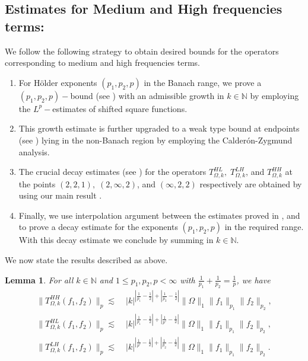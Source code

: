 \documentclass[a4paper,reqno]{amsart}
\newcommand{\N}{{\mathbb N}}
\newtheorem{lemma}[theorem]{Lemma}
\theoremstyle{definition}
\numberwithin{equation}{section}
\begin{document}
\subsection*{Estimates for Medium and High frequencies terms:} We follow the following strategy to obtain desired bounds for the operators corresponding to medium and high frequencies terms. 
\begin{enumerate}
	\item For H\"older exponents $(p_1,p_2,p)$ in the Banach range, we prove a $(p_1,p_2,p)-$bound (see ) with an admissible growth in $k\in\N$ by employing the $L^p-$estimates of shifted square functions. 
	\item This growth estimate is further upgraded to a weak type bound at endpoints (see ) lying in the non-Banach region by employing the Calder\'on-Zygmund analysis. 
	\item The crucial decay estimates (see ) for the operators $T_{\Omega,k}^{HL},\;T_{\Omega,k}^{LH}$, and $T_{\Omega,k}^{HH}$ at the points $(2,2,1),\;(2,\infty,2)$, and $(\infty,2,2)$ respectively are obtained by using our main result . 
	\item Finally, we use interpolation argument between the estimates proved in  ,  and  to  prove a decay estimate for the exponents $(p_1,p_2,p)$ in the required range. With this decay estimate we  conclude  by summing in $k\in\N$. 
\end{enumerate}
We now state the results described as above. 
\begin{lemma}\label{lemma:p1p2pGrowth}
	For all $k\in\N$ and $1\leq p_1,p_2,p<\infty$ with $\frac{1}{p_1}+\frac{1}{p_2}=\frac{1}{p}$, we have 
	\begin{align*}
		\|T_{\Omega,k}^{HH}(f_1,f_2)\|_p\lesssim&\; |k|^{\left|\frac{1}{p_1}-\frac{1}{2}\right|+\left|\frac{1}{p_2}-\frac{1}{2}\right|}\|\Omega\|_1\|f_1\|_{p_1}\|f_2\|_{p_2},\\
		\|T_{\Omega,k}^{HL}(f_1,f_2)\|_p\lesssim&\; |k|^{\left|\frac{1}{p_1}-\frac{1}{2}\right|+\left|\frac{1}{p'}-\frac{1}{2}\right|}\|\Omega\|_1\|f_1\|_{p_1}\|f_2\|_{p_2},\\
		\|T_{\Omega,k}^{LH}(f_1,f_2)\|_p\lesssim&\; |k|^{\left|\frac{1}{p'}-\frac{1}{2}\right|+\left|\frac{1}{p_2}-\frac{1}{2}\right|}\|\Omega\|_1\|f_1\|_{p_1}\|f_2\|_{p_2}.
	\end{align*}
\end{lemma}
\end{document}
